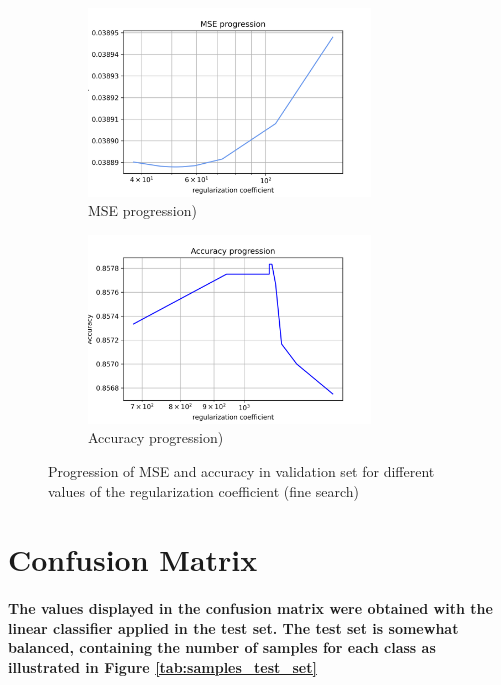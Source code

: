 \documentclass[a4paper]{article}    %
\begin{document}
\begin{figure}[H]
    \centering
    \begin{subfigure}{0.48\textwidth}
        \centering
        \includegraphics[width=7.5cm]{alpha_MSE_fine_search}
        \caption{MSE progression)}
        \label{fig:alpha-fine-mse}
    \end{subfigure}
    \hfill
    \begin{subfigure}{0.48\textwidth}
        \centering
        \includegraphics[width=7.5cm]{alpha_ACCURACY_fine_search}
        \caption{Accuracy progression)}
        \label{fig:alpha-fine-acc}
    \end{subfigure}
    \hfill
    \caption{Progression of MSE and accuracy in validation set for different values of the regularization coefficient (fine search)}
    \label{fig:alpha_fine}
\end{figure}

\section{Confusion Matrix}

\paragraph{The values displayed in the confusion matrix were obtained with the linear classifier applied in the test set. The test set is somewhat balanced, containing the number of samples for each class as illustrated in Figure \ref{tab:samples_test_set}}
\end{document}
